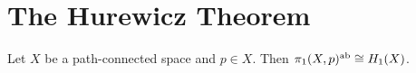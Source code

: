 \section{The Hurewicz Theorem}

\begin{theorem}
	Let $X$ be a path-connected space and $p \in X$. Then $\pi_1(X,p)^{\mathrm{ab}} \cong H_1(X)$.
\end{theorem}
